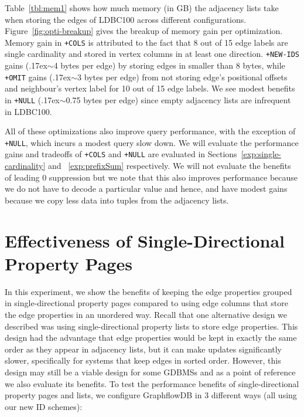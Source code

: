 Table~\ref{tbl:mem1} shows how much memory (in GB) the adjacency lists take when storing the edges of LDBC100 across different configurations.  Figure~\ref{fig:opti-breakup} gives the breakup of memory gain per optimization. Memory gain in \texttt{+COLS} is attributed to the fact that 8 out of 15 edge labels are single cardinality and stored in vertex columns in at least one direction. \texttt{+NEW-IDS} gains ({\raise.17ex\hbox{$\scriptstyle\sim$}}4 bytes per edge) by storing edges in smaller than 8 bytes, while \texttt{+OMIT} gains ({\raise.17ex\hbox{$\scriptstyle\sim$}}3 bytes per edge) from not storing edge's positional offsets and neighbour's vertex label for 10 out of 15 edge labels. We see modest benefits in \texttt{+NULL} ({\raise.17ex\hbox{$\scriptstyle\sim$}}0.75 bytes per edge) since empty adjacency lists are infrequent in LDBC100.

All of these optimizations also improve query performance, with the exception of \texttt{+NULL}, which incurs a modest query slow down. We will evaluate the performance gains and tradeoffs of \texttt{+COLS} and \texttt{+NULL} are evaluated in Sections~\ref{exp:single-cardinality} and ~\ref{exp:prefixSum} respectively. 
We will not evaluate the benefits of leading 0 suppression but we note that this also improves performance because we do not have to decode a particular value and hence, and have modest gains because we copy less data into tuples from the adjacency lists.


\section{Effectiveness of Single-Directional Property Pages}
\label{exp:property-pages}

In this experiment, we show the benefits of keeping the edge properties grouped in single-directional property pages compared to using edge columns that store the edge properties in an unordered way. 
Recall that one alternative design we described was using  single-directional property lists to store edge properties. This design had the advantage that edge properties would be kept in exactly the same order as they appear in adjacency lists, but it can make updates significantly slower, specifically for systems that keep edges in sorted order. However, this design may still be a viable design for some GDBMSs and as a point of reference we also evaluate its benefits. 
To test the performance benefits of single-directional property pages and lists, we configure GraphflowDB  in 3 different ways (all using our new ID schemes):


